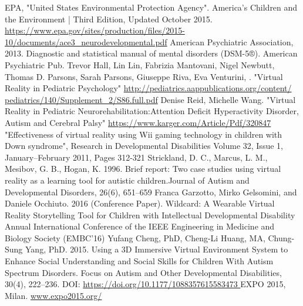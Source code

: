 \documentclass{sigchi-ext}
\begin{document}
\renewcommand\refname{ciao}
\begin{thebibliography}{100}
 EPA, "United States Environmental Protection Agency". America’s Children and the Environment | Third Edition, Updated October 2015. 
\url{https://www.epa.gov/sites/production/files/2015-10/documents/ace3_neurodevelopmental.pdf}
 American Psychiatric Association, 2013. Diagnostic and statistical manual of mental disorders (DSM-5®). American Psychiatric Pub. 
 Trevor Hall, Lin Lin, Fabrizia Mantovani, Nigel Newbutt, Thomas D. Parsons, Sarah Parsons, Giuseppe Riva, Eva Venturini, . "Virtual Reality in Pediatric Psychology" 
\url{http://pediatrics.aappublications.org/content/ pediatrics/140/Supplement_2/S86.full.pdf}
 Denise Reid, Michelle Wang. "Virtual Reality in Pediatric Neurorehabilitation:Attention Deficit Hyperactivity Disorder, Autism and Cerebral Palsy" 
\url{https://www.karger.com/Article/Pdf/320847} 
 "Effectiveness of virtual reality using Wii gaming technology in children with Down syndrome", Research in Developmental Disabilities Volume 32, Issue 1, January–February 2011, Pages 312-321
 Strickland, D. C., Marcus, L. M., Mesibov, G. B., Hogan, K. 1996. Brief report: Two case studies using virtual reality as a learning tool for autistic children.Journal of Autism and Developmental Disorders, 26(6), 651–659  
 Franca Garzotto, Mirko Gelsomini, and Daniele Occhiuto. 2016 (Conference Paper). Wildcard: A Wearable Virtual Reality Storytelling Tool for Children with Intellectual Developmental Disability Annual International Conference of the IEEE Engineering in Medicine and Biology Society (EMBC’16)
 Yufang Cheng, PhD, Cheng-Li Huang, MA, Chung-Sung Yang, PhD. 2015. Using a 3D Immersive Virtual Environment System to Enhance Social Understanding and Social Skills for Children With Autism Spectrum Disorders. Focus on Autism and Other Developmental Disabilities, 30(4), 222–236. DOI:  \url{https://doi.org/10.1177/1088357615583473 }
 EXPO 2015, Milan. \url{www.expo2015.org/}
\end{thebibliography}

\balance{} 

%
\end{document}
